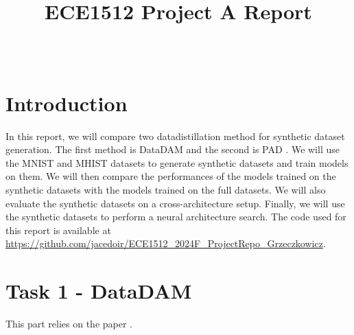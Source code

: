 \documentclass[onecolumn]{IEEEtran}
\begin{document}
\title{ECE1512 Project A Report}

\author{ \\
}

\maketitle
\thispagestyle{fancy} %




\vfill
\tableofcontents
\vfill

\newpage

\section{Introduction}
In this report, we will compare two datadistillation method for synthetic dataset generation. The first method is DataDAM \cite{sajedi2023datadam} and the second is PAD \cite{li2024prioritize}. We will use the MNIST and MHIST datasets to generate synthetic datasets and train models on them. We will then compare the performances of the models trained on the synthetic datasets with the models trained on the full datasets. We will also evaluate the synthetic datasets on a cross-architecture setup. Finally, we will use the synthetic datasets to perform a neural architecture search.
The code used for this report is available at \url{https://github.com/jacedoir/ECE1512_2024F_ProjectRepo_Grzeczkowicz}.

\section{Task 1 - DataDAM}
This part relies on the paper \cite{sajedi2023datadam}.
\end{document}
